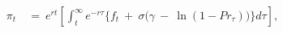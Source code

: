 \begin{equation}
\begin{split}
    \pi_{t} \
    & = \ e^{rt} \left[ \int_{t}^{\infty} e^{-r\tau} \Big\{ f_{t} \ + \ \sigma \big( \gamma \ - \ \ln(1 - Pr_{\tau}) \big) \Big\} d\tau \right],
\end{split}
\label{Equation:Social-Planners-Problem_Euler-Equation}
\end{equation}